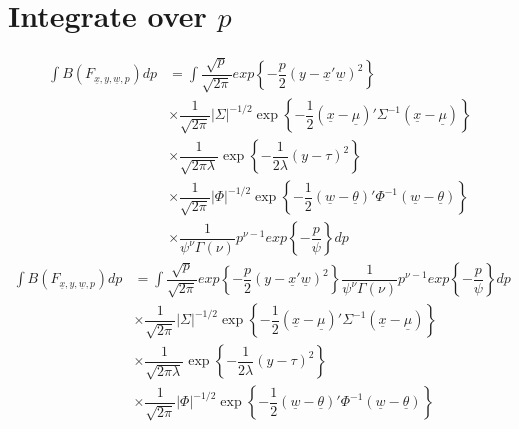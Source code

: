 \documentclass[fleqn]{minimal}
\begin{document}
\section{Integrate over $p$}

\begin{align*}
  \int B\left(F_{\underline{x}, y, \underline{w}, p}\right) dp
  & = \int \dfrac{\sqrt{p}}{\sqrt{2\pi}}
  exp
  \left\{
    - \dfrac{p}{2}
    \left( y - \underline{x}'\underline{w} \right)^2
  \right\} \\
  & \times
  \dfrac{1}{\sqrt{2\pi}}
  \left| \Sigma \right|^{-1/2}
  \exp
  \left\{
    - \dfrac{1}{2}
    \left( \underline{x} - \underline{\mu}\right)'
    \Sigma^{-1}
    \left( \underline{x} - \underline{\mu}\right)
  \right\} \\
  & \times
  \dfrac{1}{\sqrt{2\pi\lambda}}
  \exp
  \left\{
    - \dfrac{1}{2\lambda}
    \left(y - \tau\right)^2
  \right\} \\
  & \times
  \dfrac{1}{\sqrt{2\pi}}
  \left| \Phi \right|^{-1/2}
  \exp
  \left\{
    - \dfrac{1}{2}
    \left( \underline{w} - \underline{\theta}\right)'
    \Phi^{-1}
    \left( \underline{w} - \underline{\theta}\right)
  \right\} \\
  & \times
  \dfrac{1}{\psi^\nu \Gamma(\nu)}
  p^{\nu-1}
  exp
  \left\{
    - \dfrac{p}{\psi}
  \right\}
  dp
\end{align*}
\begin{align*}
  \int B\left(F_{\underline{x}, y, \underline{w}, p}\right) dp
  & = \int \dfrac{\sqrt{p}}{\sqrt{2\pi}}
  exp
  \left\{
    - \dfrac{p}{2}
    \left( y - \underline{x}'\underline{w} \right)^2
  \right\}
  \dfrac{1}{\psi^\nu \Gamma(\nu)}
  p^{\nu-1}
  exp
  \left\{
    - \dfrac{p}{\psi}
  \right\}
  dp \\ 
  & \times
  \dfrac{1}{\sqrt{2\pi}}
  \left| \Sigma \right|^{-1/2}
  \exp
  \left\{
    - \dfrac{1}{2}
    \left( \underline{x} - \underline{\mu}\right)'
    \Sigma^{-1}
    \left( \underline{x} - \underline{\mu}\right)
  \right\} \\
  & \times
  \dfrac{1}{\sqrt{2\pi\lambda}}
  \exp
  \left\{
    - \dfrac{1}{2\lambda}
    \left(y - \tau\right)^2
  \right\} \\
  & \times
  \dfrac{1}{\sqrt{2\pi}}
  \left| \Phi \right|^{-1/2}
  \exp
  \left\{
    - \dfrac{1}{2}
    \left( \underline{w} - \underline{\theta}\right)'
    \Phi^{-1}
    \left( \underline{w} - \underline{\theta}\right)
  \right\}
\end{align*}
\end{document}

